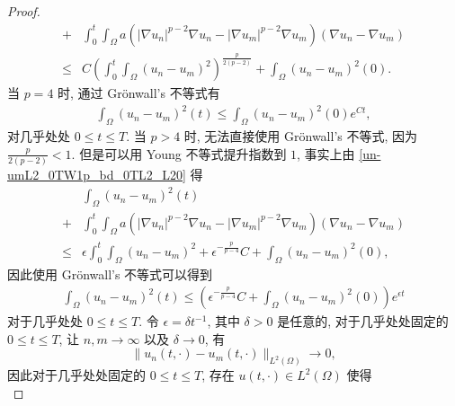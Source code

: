 \documentclass[twoside,longtitle]{LZUthesis}
\theoremstyle{definition}
\numberwithin{equation}{chapter}
\newcommand*\abs[1]{\lvert#1\rvert}
\newcommand*\norm[1]{\lVert#1\rVert}
\begin{document}
\begin{proof}
\begin{equation}
\begin{split}
			+{} & \int_{0}^{t}\int_{\Omega}a
			\left(\abs{\nabla u_n}^{p-2}\nabla u_n
			- \abs{\nabla u_m}^{p-2}\nabla u_m\right)
			\left(\nabla u_n - \nabla u_m\right)\\
			\leq{} & C\left(\int_0^t\int_{\Omega}
			\left(u_n-u_m\right)^2\right)^{\frac{p}{2(p-2)}}
			+ \int_{\Omega}\left(u_n-u_m\right)^2(0).
		\end{split}
	\end{equation}
	当 $p=4$ 时, 通过 Gr\"onwall's 不等式有
	\begin{equation}
		\begin{split}
			\int_{\Omega}\left( u_n-u_m \right)^2(t)
			\leq \int_{\Omega}\left(u_n-u_m\right)^2(0)e^{Ct} ,
		\end{split}
	\end{equation}
	对几乎处处 $0 \leq t \leq T$. 当 $p>4$ 时,
	无法直接使用 Gr\"onwall's 不等式,
	因为 $\frac{p}{2(p-2)}<1$. 但是可以用 Young 不等式提升指数到 $1$,
	事实上由 \cref{un-umL2_0TW1p_bd_0TL2_L20} 得
	\begin{equation}
		\begin{split}
			& \int_{\Omega}\left(u_n-u_m\right)^2(t)\\
			+{} & \int_{0}^{t}\int_{\Omega}a
			\left(\abs{\nabla u_n}^{p-2}\nabla u_n
			- \abs{\nabla u_m}^{p-2}\nabla u_m\right)
			\left(\nabla u_n - \nabla u_m\right)\\
			\leq{} & \epsilon\int_0^t\int_{\Omega}
			\left(u_n-u_m\right)^2
			+ \epsilon^{-\frac{p}{p-4}}C
			+ \int_{\Omega}\left(u_n-u_m\right)^2(0),
		\end{split}
	\end{equation}
	因此使用 Gr\"onwall's 不等式可以得到
	\begin{equation}\label{un-umL2_gronwall}
		\begin{split}
			\int_{\Omega}\left( u_n-u_m \right)^2(t)
			\leq \left( 
				\epsilon^{-\frac{p}{p-4}}C
				+ \int_{\Omega}\left(u_n-u_m\right)^2(0)
				\right)e^{\epsilon t}
		\end{split}
	\end{equation}
	对于几乎处处 $0 \leq t \leq T$. 令 $\epsilon = \delta t^{-1}$,
	其中 $\delta > 0$ 是任意的, 对于几乎处处固定的 $0 \leq t \leq T$,
	让 $n,m \to \infty$ 以及 $\delta \to 0$, 有
	\begin{equation}\label{cauchy_in_L2}
		\norm{u_n(t,\cdot)-u_m(t,\cdot)}_{L^2(\Omega)} \to 0,
	\end{equation}
	因此对于几乎处处固定的 $0 \leq t \leq T$, 存在
	$u(t,\cdot) \in L^2(\Omega)$ 使得
	\begin{equation}

\end{equation}
\end{proof}
\end{document}
